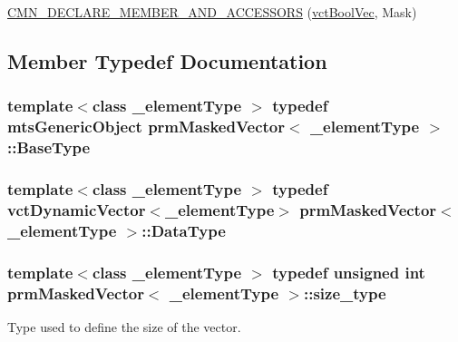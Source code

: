 {\bf }\par
\begin{DoxyCompactItemize}
\item 
\hyperlink{classprm_masked_vector_a87e8fdfa927cd5d3bbe2916e21242da0}{C\+M\+N\+\_\+\+D\+E\+C\+L\+A\+R\+E\+\_\+\+M\+E\+M\+B\+E\+R\+\_\+\+A\+N\+D\+\_\+\+A\+C\+C\+E\+S\+S\+O\+R\+S} (\hyperlink{vct_dynamic_vector_types_8h_aeb2237c134aee3769198bd9d55c8a9e0}{vct\+Bool\+Vec}, Mask)
\end{DoxyCompactItemize}



\subsection{Member Typedef Documentation}
\hypertarget{classprm_masked_vector_ad206ecada790ba4b049868d83fd2abc2}{}
\subsubsection[{Base\+Type}]{\setlength{\rightskip}{0pt plus 5cm}template$<$class \+\_\+element\+Type $>$ typedef {\bf mts\+Generic\+Object} {\bf prm\+Masked\+Vector}$<$ \+\_\+element\+Type $>$\+::{\bf Base\+Type}}\label{classprm_masked_vector_ad206ecada790ba4b049868d83fd2abc2}
\hypertarget{classprm_masked_vector_a7699da34296337db788196d01482defb}{}
\subsubsection[{Data\+Type}]{\setlength{\rightskip}{0pt plus 5cm}template$<$class \+\_\+element\+Type $>$ typedef {\bf vct\+Dynamic\+Vector}$<$\+\_\+element\+Type$>$ {\bf prm\+Masked\+Vector}$<$ \+\_\+element\+Type $>$\+::{\bf Data\+Type}}\label{classprm_masked_vector_a7699da34296337db788196d01482defb}
\hypertarget{classprm_masked_vector_af5110e0749d68ef7b7424a11d746b964}{}
\subsubsection[{size\+\_\+type}]{\setlength{\rightskip}{0pt plus 5cm}template$<$class \+\_\+element\+Type $>$ typedef unsigned int {\bf prm\+Masked\+Vector}$<$ \+\_\+element\+Type $>$\+::{\bf size\+\_\+type}\hspace{0.3cm}{\ttfamily [protected]}}\label{classprm_masked_vector_af5110e0749d68ef7b7424a11d746b964}
Type used to define the size of the vector. \hypertarget{classprm_masked_vector_aaa6c739a3050e8d46d9a7234ed4edc69}{}
